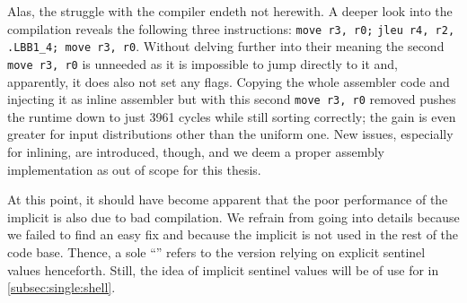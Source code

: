 Alas, the struggle with the compiler endeth not herewith.
A deeper look into the compilation reveals the following three instructions:
\lstinline|move r3, r0;| \lstinline|jleu r4, r2,| \lstinline|.LBB1_4; move r3, r0|.
Without delving further into their meaning \Dash the second \lstinline|move r3, r0| is unneeded as it is impossible to jump directly to it and, apparently, it does also not set any flags.
Copying the whole assembler code and injecting it as inline assembler but with this second \lstinline|move r3, r0| removed pushes the runtime down to just 3961 cycles while still sorting correctly;
the gain is even greater for input distributions other than the uniform one.
New issues, especially for inlining, are introduced, though, and we deem a proper assembly implementation as out of scope for this thesis.

At this point, it should have become apparent that the poor performance of the implicit \IS{} is also due to bad compilation.
We refrain from going into details because we failed to find an easy fix and because the implicit \IS{} is not used in the rest of the code base.
Thence, a sole \enquote{\IS{}} refers to the version relying on explicit sentinel values henceforth.
Still, the idea of implicit sentinel values will be of use for \ShS{} in \cref{subsec:single:shell}.
